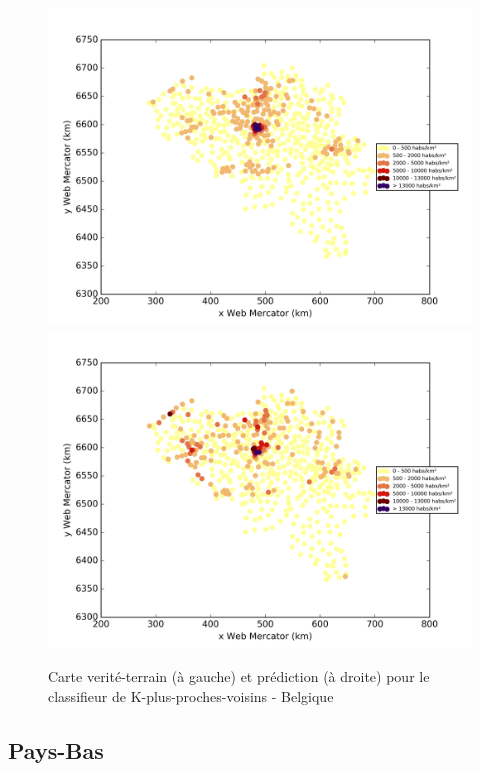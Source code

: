 \documentclass{book}
\begin{document}
\begin{figure}[H]
\centerline{
\includegraphics[scale=0.5]{../../data/Belgique/test/Nearest_Neighboors_Classification/Nearest_Neighboors_Classification/density_ground_truth.png}
\includegraphics[scale=0.5]{../../data/Belgique/test/Nearest_Neighboors_Classification/Nearest_Neighboors_Classification/density_classification.png}
}
\caption{Carte verité-terrain (à gauche) et prédiction (à droite) pour le classifieur de K-plus-proches-voisins - Belgique}
\label{nn_carte_belgique}
\end{figure}

\subsection{Pays-Bas}
\end{document}
